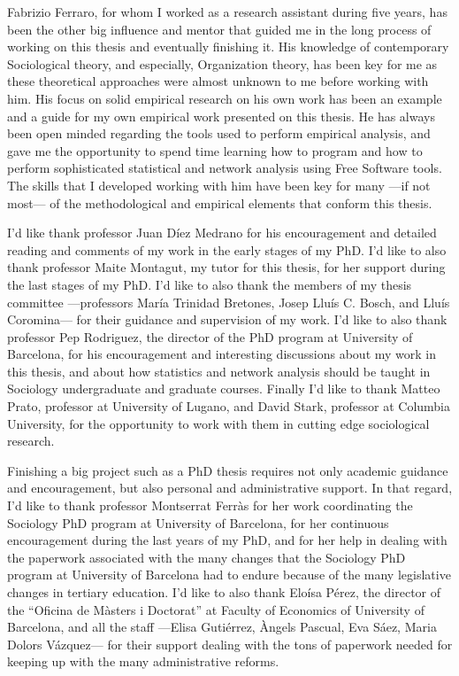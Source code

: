 Fabrizio Ferraro, for whom I worked as a research assistant during five years, has been the other big influence and mentor that guided me in the long process of working on this thesis and eventually finishing it. His knowledge of contemporary Sociological theory, and especially, Organization theory, has been key for me as these theoretical approaches were almost unknown to me before working with him. His focus on solid empirical research on his own work has been an example and a guide for my own empirical work presented on this thesis. He has always been open minded regarding the tools used to perform empirical analysis, and gave me the opportunity to spend time learning how to program and how to perform sophisticated statistical and network analysis using Free Software tools. The skills that I developed working with him have been key for many ---if not most--- of the methodological and empirical elements that conform this thesis.

I'd like thank professor Juan Díez Medrano for his encouragement and detailed reading and comments of my work in the early stages of my PhD. I'd like to also thank professor Maite Montagut, my tutor for this thesis, for her support during the last stages of my PhD. I'd like to also thank the members of my thesis committee ---professors María Trinidad Bretones, Josep Lluís C. Bosch, and Lluís Coromina--- for their guidance and supervision of my work. I'd like to also thank professor Pep Rodriguez, the director of the PhD program at University of Barcelona, for his encouragement and interesting discussions about my work in this thesis, and about how statistics and network analysis should be taught in Sociology undergraduate and graduate courses. Finally I'd like to thank Matteo Prato, professor at University of Lugano, and David Stark, professor at Columbia University, for the opportunity to work with them in cutting edge sociological research.

Finishing a big project such as a PhD thesis requires not only academic guidance and encouragement, but also personal and administrative support. In that regard, I'd like to thank professor Montserrat Ferràs for her work coordinating the Sociology PhD program at University of Barcelona, for her continuous encouragement during the last years of my PhD, and for her help in dealing with the paperwork associated with the many changes that the Sociology PhD program at University of Barcelona had to endure because of the many legislative changes in tertiary education. I'd like to also thank Eloísa Pérez, the director of the ``Oficina de Màsters i Doctorat'' at Faculty of Economics of University of Barcelona, and all the staff ---Elisa Gutiérrez, Àngels Pascual, Eva Sáez, Maria Dolors Vázquez--- for their support dealing with the tons of paperwork needed for keeping up with the many administrative reforms.

